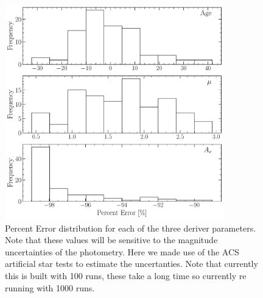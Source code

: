 \begin{figure}
  \centering
  \includegraphics[width=0.85\textwidth]{figures/ngc2808/DistributionOfErrors.pdf}
  \caption{Percent Error distribution for each of the three deriver parameters. Note that these values will be sensitive to the magnitude uncertainties of the photometry. Here we made use of the ACS artificial star tests to estimate the uncertanties. {\color{blue}Note that currently this is built with 100 runs, these take a long time so currently re running with 1000 runs.}}
  \label{fig:validationDist}
\end{figure}
